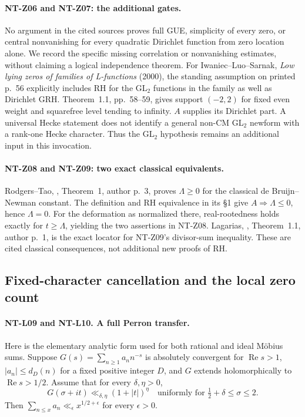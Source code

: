 \documentclass[11pt,a4paper]{article}
\begin{document}
\paragraph{NT-Z06 and NT-Z07: the additional gates.}
No argument in the cited sources proves full GUE, simplicity of every
zero, or central nonvanishing for every quadratic Dirichlet function
from zero location alone.  We record the specific missing correlation
or nonvanishing estimates, without claiming a logical independence
theorem.  For Iwaniec--Luo--Sarnak, \emph{Low lying zeros of families of
L-functions} (2000), the standing assumption on printed p.~56 explicitly
includes RH for the GL$_2$ functions in the family as well as Dirichlet
GRH.  Theorem~1.1, pp.~58--59, gives support $(-2,2)$ for fixed even
weight and squarefree level tending to infinity.  $A$ supplies its
Dirichlet part.  A universal Hecke statement does not identify a general
non-CM GL$_2$ newform with a rank-one Hecke character.  Thus the GL$_2$
hypothesis remains an additional input in this invocation.

\paragraph{NT-Z08 and NT-Z09: two exact classical equivalents.}
Rodgers--Tao, , Theorem~1, author p.~3,
proves $\Lambda\ge0$ for the classical de Bruijn--Newman constant.
The definition and RH equivalence in its \S1 give
$A\Rightarrow\Lambda\le0$, hence $\Lambda=0$.
For the deformation as normalized there, real-rootedness holds exactly
for $t\ge\Lambda$, yielding the two assertions in NT-Z08.
Lagarias, , Theorem~1.1, author p.~1,
is the exact locator for NT-Z09's divisor-sum inequality.
These are cited classical consequences, not additional new proofs of RH.

\subsection{Fixed-character cancellation and the local zero count}

\paragraph{NT-L09 and NT-L10. A full Perron transfer.}
Here is the elementary analytic form used for both rational and ideal
M\"obius sums.  Suppose
$G(s)=\sum_{n\ge1}a_nn^{-s}$ is absolutely convergent for
$\operatorname{Re}s>1$, $|a_n|\le d_D(n)$ for a fixed positive integer
$D$, and $G$ extends holomorphically to $\operatorname{Re}s>1/2$.
Assume that for every $\delta,\eta>0$,
\[
 G(\sigma+it)\ll_{\delta,\eta}(1+|t|)^\eta
 \quad\text{uniformly for }\tfrac12+\delta\le\sigma\le2.
\tag{NT-Perron-input}
\]
Then $\sum_{n\le x}a_n\ll_\epsilon x^{1/2+\epsilon}$ for every
$\epsilon>0$.
\end{document}
